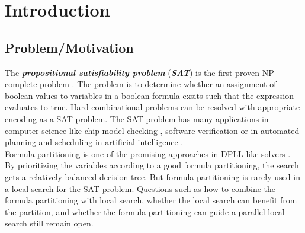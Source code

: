 \documentclass[12pt,a4paper,twoside]{scrartcl}
\numberwithin{equation}{section}
\begin{document}
\vfill\vfill\vfill
\clearpage


\pagestyle{plain}
  
\renewcommand\sectionmark[1]{\markboth{\thesection\quad\MakeUppercase{#1}}{\thesection\quad\MakeUppercase{#1}}}
\renewcommand\subsectionmark[1]{\markright{\thesubsection\quad\MakeUppercase{#1}}}


\tableofcontents
\afterpage{\null\newpage}
\clearpage

\pagestyle{normal}

\section{Introduction} 
\label{sec:Intro}
\subsection{Problem/Motivation} 
The \emph{\textbf{propositional satisfiability problem}} (\emph{\textbf{SAT}}) is the first proven NP-complete problem \cite{cook1971complexity}. The problem is to determine whether an assignment of boolean values to variables in a boolean formula exsits such that the expression evaluates to true. Hard combinational problems can be resolved with appropriate encoding as a SAT problem.
The SAT problem has many applications in computer science like chip model checking     \cite{clarke2001bounded}, software verification \cite{ivanvcic2008efficient} or in automated planning and scheduling in artificial intelligence \cite{kautz1999unifying}. \\
Formula partitioning is one of the promising approaches in DPLL-like solvers \cite{mann2017guiding}. By prioritizing the variables according to a good formula partitioning, the search gets a relatively balanced decision tree. But formula partitioning is rarely used in a local search for the SAT problem. Questions such as how to combine the formula partitioning with local search, whether the local search can benefit from the partition, and whether the formula partitioning can guide a parallel local search still remain open. 
\end{document}
